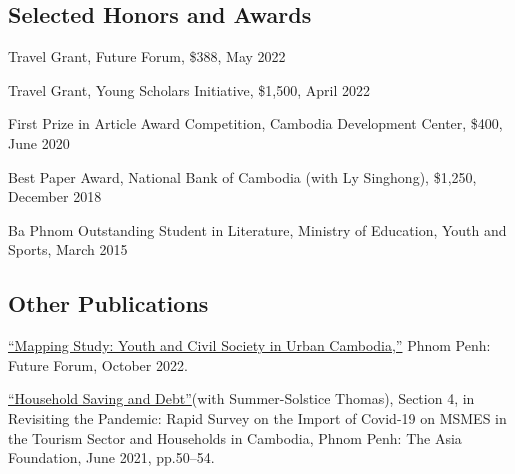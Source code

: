 \documentclass[10pt,a4paper]{article}
\begin{document}
\subsection*{Selected Honors and Awards}

\parindent=0pt
	
	Travel Grant, Future Forum, \$388, May 2022 
	
	Travel Grant, Young Scholars Initiative, \$1,500, April 2022 
	
	First Prize in Article Award Competition, Cambodia Development Center, \$400, June 2020
	
	Best Paper Award, National Bank of Cambodia (with Ly Singhong), \$1,250, December 2018 
	
	Ba Phnom Outstanding Student in Literature, Ministry of Education, Youth and Sports, March 2015




\subsection*{Other Publications}



	\href{}{``Mapping Study: Youth and Civil Society in Urban Cambodia,”} Phnom Penh: Future Forum, October 2022.\\ \vspace{-.5em} 
	
	\href{https://kosalnith.github.io/research/policies/COVID-19-HHSavingsDebt.pdf}{``Household Saving and Debt”}(with Summer-Solstice Thomas), Section 4, in Revisiting the Pandemic: Rapid Survey on the Import of Covid-19 on MSMES in the Tourism Sector and Households in Cambodia, Phnom Penh: The Asia Foundation, June 2021, pp.50--54.\\ \vspace{-.5em} 
			
\end{document}

